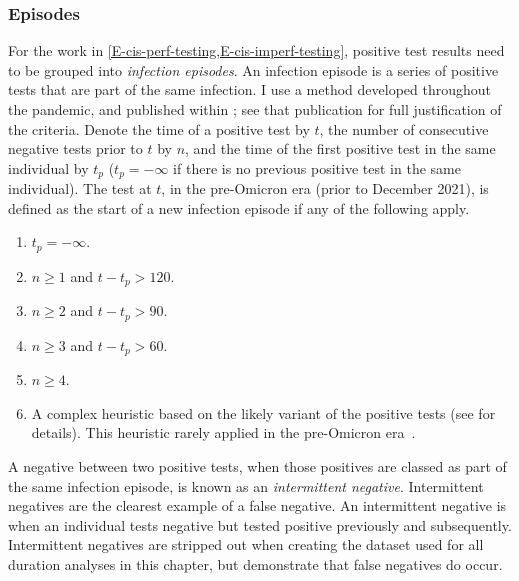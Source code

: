 \documentclass[thesis.tex]{subfiles}
\begin{document}
\subsubsection{Episodes}

For the work in \cref{E-cis-perf-testing,E-cis-imperf-testing}, positive test results need to be grouped into \emph{infection episodes}.
An infection episode is a series of positive tests that are part of the same infection.
I use a method developed throughout the pandemic, and published within \textcite{weiRisk}; see that publication for full justification of the criteria.
Denote the time of a positive test by $t$, the number of consecutive negative tests prior to $t$ by $n$, and the time of the first positive test in the same individual by $t_p$ ($t_p = -\infty$ if there is no previous positive test in the same individual).
The test at $t$, in the pre-Omicron era (prior to December 2021), is defined as the start of a new infection episode if any of the following apply.
\begin{enumerate}
  \item $t_p = -\infty$.
  \item $n \geq 1$ and $t - t_p > 120$.
  \item $n \geq 2$ and $t - t_p > 90$.
  \item $n \geq 3$ and $t - t_p > 60$.
  \item $n \geq 4$.
  \item A complex heuristic based on the likely variant of the positive tests (see \textcite{weiRisk} for details). This heuristic rarely applied in the pre-Omicron era~.
\end{enumerate}

A negative between two positive tests, when those positives are classed as part of the same infection episode, is known as an \emph{intermittent negative}.
Intermittent negatives are the clearest example of a false negative.
An intermittent negative is when an individual tests negative but tested positive previously and subsequently.
Intermittent negatives are stripped out when creating the dataset used for all duration analyses in this chapter, but demonstrate that false negatives do occur.



\ifSubfilesClassLoaded{
  \listoftodos
}{}
\end{document}
